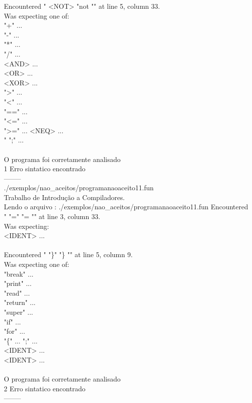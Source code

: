 \documentclass[
	article,			%
	11pt,				%
	oneside,			%
	a4paper,			%
	portuguese,			%
	brazil,				%
	sumario=tradicional
	]{abntex2}
\begin{document}
Encountered " <NOT> "not "" at line 5, column 33.\\
Was expecting one of:\\
    "+" ...\\
    "-" ...\\
    "*" ...\\
    "/" ...\\
    <AND> ...\\
    <OR> ...\\
    <XOR> ...\\
    ">" ...\\
    "<" ...\\
    "==" ...\\
    "<=" ...\\
    ">=" ...
    <NEQ> ...\\
    "%
    ";" ...\\
\\
O programa foi corretamente analisado\\
1 Erro sintatico encontrado\\
--------\\
./exemplos/nao\_aceitos/programanaoaceito11.fun\\
Trabalho de Introdução a Compiladores.\\
Lendo o arquivo : ./exemplos/nao\_aceitos/programanaoaceito11.fun
Encountered " "=" "= "" at line 3, column 33.\\
Was expecting:\\
    <IDENT> ...\\
\\
Encountered " "\}" "\} "" at line 5, column 9.\\
Was expecting one of:\\
    "break" ...\\
    "print" ...\\
    "read" ...\\
    "return" ...\\
    "super" ...\\
    "if" ...\\
    "for" ...\\
    "\{" ...
    ";" ...\\
    <IDENT> ...\\
    <IDENT> ...\\
\\
O programa foi corretamente analisado\\
2 Erro sintatico encontrado\\
--------\\
\end{document}
